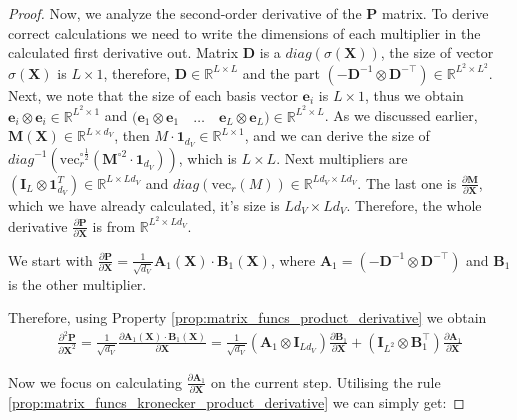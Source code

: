 \documentclass{article}
\begin{document}
\begin{proof}
Now, we analyze the second-order derivative of the $\mathbf{P}$ matrix. To derive correct calculations we need to write the dimensions of each multiplier in the calculated first derivative out. Matrix $\mathbf{D}$ is a $\textit{diag}(\sigma(\mathbf{X}))$, the size of vector $\sigma(\mathbf{X})$ is $L\times 1$, therefore, $\mathbf{D} \in \mathbb{R}^{L\times L}$ and the part $\left(-\mathbf{D}^{-1} \otimes \mathbf{D}^{-\top} \right) \in \mathbb{R}^{L^2 \times L^2}$. Next, we note that the size of each basis vector $\mathbf{e}_i$ is $L\times1$, thus we obtain $\mathbf{e}_i \otimes \mathbf{e}_i \in \mathbb{R}^{L^2 \times 1}$ and $ \Big(\mathbf{e}_1 \otimes \mathbf{e}_1 \quad \dots  \quad \mathbf{e}_L \otimes \mathbf{e}_L\Big) \in \mathbb{R}^{L^2 \times L}$. As we discussed earlier, $\mathbf{M}(\mathbf{X}) \in \mathbb{R}^{L \times d_V}$, then $M\cdot\mathbf{1}_{d_V} \in \mathbb{R}^{L \times 1}$, and we can derive the size of $\textit{diag}^{-1}(\mathrm{vec}_r^{\circ \frac{1}{2}}(\mathbf{M}^{\circ{2}}\cdot\mathbf{1}_{d_V}))$, which is $L \times L$. Next multipliers are $(\mathbf{I}_L \otimes \mathbf{1}^T_{d_V}) \in \mathbb{R}^{L \times Ld_V}$ and $\textit{diag}(\mathrm{vec}_r (M)) \in \mathbb{R}^{Ld_V \times Ld_V}$. The last one is $\frac{\partial \mathbf{M}}{\partial \mathbf{X}}$, which we have already calculated, it's size is $Ld_V \times Ld_V$. Therefore, the whole derivative $\frac{\partial \mathbf{P}}{\partial \mathbf{X}}$ is from $\mathbb{R}^{L^2 \times Ld_V}$.
 
We start with $\frac{\partial \mathbf{P}}{\partial \mathbf{X}} = \frac{1}{\sqrt{d_V}} \mathbf{A}_1(\mathbf{X})\cdot \mathbf{B}_1(\mathbf{X})$, where $\mathbf{A}_1 = \left(-\mathbf{D}^{-1} \otimes \mathbf{D}^{-\top} \right)$ and $\mathbf{B}_1$ is the other multiplier.

Therefore, using Property \ref{prop:matrix_funcs_product_derivative} we obtain 
\begin{align*}
    \frac{\partial^2 \mathbf{P}}{\partial \mathbf{X}^2} = \frac{1}{\sqrt{d_V}} \frac{\partial \mathbf{A}_1(\mathbf{X})\cdot \mathbf{B}_1(\mathbf{X})}{\partial \mathbf{X}} = \frac{1}{\sqrt{d_V}} \left(\mathbf{A}_1 \otimes  \mathbf{I}_{Ld_V}  \right) \frac{\partial \mathbf{B}_1}{\partial \mathbf{X}} + \left( \mathbf{I}_{L^2} \otimes  \mathbf{B}_1^\top \right) \frac{\partial \mathbf{A}_1}{\partial \mathbf{X}}
\end{align*}

Now we focus on calculating $\frac{\partial \mathbf{A}_1}{\partial \mathbf{X}}$ on the current step. Utilising the rule \ref{prop:matrix_funcs_kronecker_product_derivative} we can simply get:


\end{proof}
\end{document}
